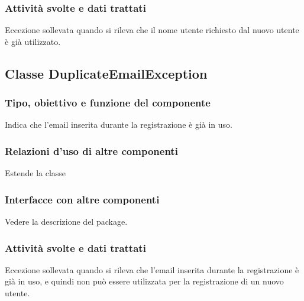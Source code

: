 \subsubsection*{Attivit\`a svolte e dati trattati}
Eccezione sollevata quando si rileva che il nome utente richiesto dal nuovo
utente \`e gi\`a utilizzato.

\subsection{Classe DuplicateEmailException}
\subsubsection*{Tipo, obiettivo e funzione del componente}
Indica che l'email inserita durante la registrazione \`e gi\`a in uso.
\subsubsection*{Relazioni d'uso di altre componenti}
Estende la classe 
\subsubsection*{Interfacce con altre componenti}
Vedere la descrizione del package.
\subsubsection*{Attivit\`a svolte e dati trattati}
Eccezione sollevata quando si rileva che l'email inserita durante la
registrazione \`e gi\`a in uso, e quindi non pu\`o essere utilizzata per la
registrazione di un nuovo utente.

